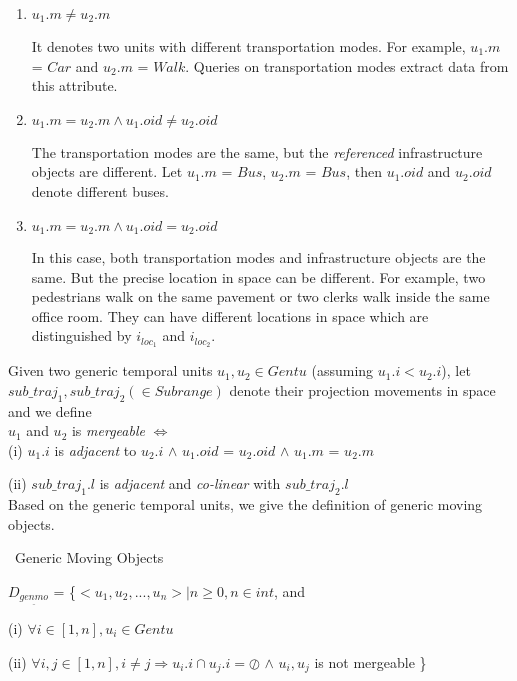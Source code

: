 \begin{enumerate}
 \item $u_1.m\neq u_2.m$
  
  It denotes two units with different transportation modes. For example, $u_1.m$ = $Car$ and 
$u_2.m$ = $Walk$. Queries on transportation modes extract data from this attribute. \\

 \item $u_1.m=u_2.m \wedge u_1.oid\neq u_2.oid$ 

The transportation modes are the same, but the \textit{referenced} infrastructure objects are different. Let $u_1.m$ = $Bus$, $u_2.m$ = $Bus$, then $u_1.oid$  and $u_2.oid$ denote different
buses. \\

 \item $u_1.m=u_2.m \wedge u_1.oid=u_2.oid$ 

In this case, both transportation modes and infrastructure objects are the same. But the
precise location in space can be different. For example, two pedestrians walk on the
same pavement or two clerks walk inside the same office room. They can have different
locations in space which are distinguished by $i_{loc_1}$ and $i_{loc_2}$. \\
\end{enumerate}

Given two generic temporal units $u_1,u_2 \in Gentu$ (assuming $u_1.i<u_2.i$),  
let $sub\_traj_1,sub\_traj_2 (\in Subrange)$ denote their projection movements in space and we define \\

$u_1$ and $u_2$ is \textit{mergeable} $\Leftrightarrow$ \\

(i) $u_1.i$ is \textit{adjacent} to $u_2.i$ $\wedge$ $u_1.oid$ = $u_2.oid$ $\wedge$ $u_1.m$ = $u_2.m$ 

(ii) $sub\_traj_1.l$ is \textit{adjacent} and \textit{co-linear} with $sub\_traj_2.l$ \\

Based on the generic temporal units, we give the definition of generic moving objects.

\begin{Statement}
\label{generictrajectory}
\ Generic Moving Objects

$D_{\underline{genmo}}$ = \{$<u_1,u_2,...,u_n>|n \geq 0,n \in int$, and

(i) $\forall i \in [1,n], u_i \in Gentu$ 

(ii) $\forall i,j \in [1,n], i\neq j \Rightarrow u_i.i \cap u_j.i = \oslash$ 
$\wedge$ $u_i,u_j$ is not mergeable \}
\end{Statement}

